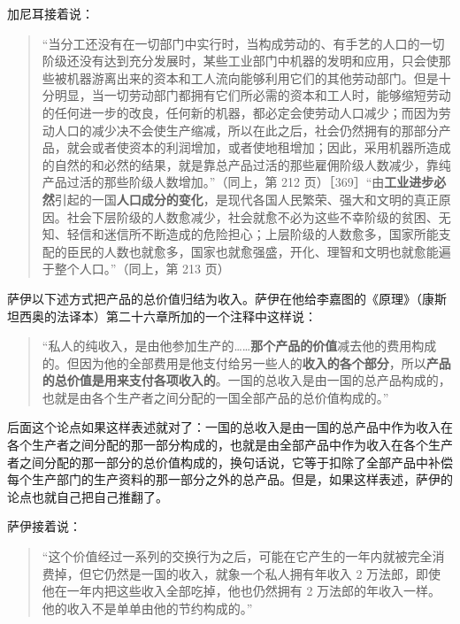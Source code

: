 
加尼耳接着说：

\begin{quote}“当分工还没有在一切部门中实行时，当构成劳动的、有手艺的人口的一切阶级还没有达到充分发展时，某些工业部门中机器的发明和应用，只会使那些被机器游离出来的资本和工人流向能够利用它们的其他劳动部门。但是十分明显，当一切劳动部门都拥有它们所必需的资本和工人时，能够缩短劳动的任何进一步的改良，任何新的机器，都必定会使劳动人口减少；而因为劳动人口的减少决不会使生产缩减，所以在此之后，社会仍然拥有的那部分产品，就会或者使资本的利润增加，或者使地租增加；因此，采用机器所造成的自然的和必然的结果，就是靠总产品过活的那些雇佣阶级人数减少，靠纯产品过活的那些阶级人数增加。”（同上，第 212 页）［369］“由\textbf{工业进步必然}引起的一国\textbf{人口成分的变化}，是现代各国人民繁荣、强大和文明的真正原因。社会下层阶级的人数愈减少，社会就愈不必为这些不幸阶级的贫困、无知、轻信和迷信所不断造成的危险担心；上层阶级的人数愈多，国家所能支配的臣民的人数也就愈多，国家也就愈强盛，开化、理智和文明也就愈能遍于整个人口。”（同上，第 213 页）\end{quote}

\fontbox{~\{}萨伊以下述方式把产品的总价值归结为收入。萨伊在他给李嘉图的《原理》（康斯坦西奥的法译本）第二十六章所加的一个注释中这样说：

\begin{quote}“私人的纯收入，是由他参加生产的……\textbf{那个产品的价值}减去他的费用构成的。但因为他的全部费用是他支付给另一些人的\textbf{收入的各个部分}，所以\textbf{产品的总价值是用来支付各项收入的}。一国的总收入是由一国的总产品构成的，也就是由各个生产者之间分配的一国全部产品的总价值构成的。”\end{quote}

后面这个论点如果这样表述就对了：一国的总收入是由一国的总产品中作为收入在各个生产者之间分配的那一部分构成的，也就是由全部产品中作为收入在各个生产者之间分配的那一部分的总价值构成的，换句话说，它等于扣除了全部产品中补偿每个生产部门的生产资料的那一部分之外的总产品。但是，如果这样表述，萨伊的论点也就自己把自己推翻了。

萨伊接着说：

\begin{quote}“这个价值经过一系列的交换行为之后，可能在它产生的一年内就被完全消费掉，但它仍然是一国的收入，就象一个私人拥有年收入 2 万法郎，即使他在一年内把这些收入全部吃掉，他也仍然拥有 2 万法郎的年收入一样。他的收入不是单单由他的节约构成的。”\end{quote}

